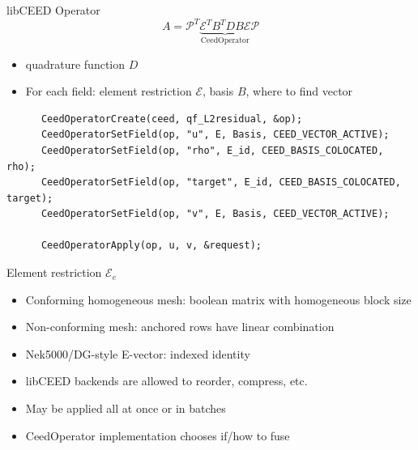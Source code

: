 \documentclass[aspectratio=1610]{beamer}
\begin{document}
\begin{frame}[fragile]{libCEED Operator}
  \begin{equation*}
    A = \mathcal P^T \underbrace{\mathcal E^T B^T D B \mathcal E}_{\text{CeedOperator}} \mathcal P
  \end{equation*}
  \begin{itemize}
  \item quadrature function $D$
  \item For each field: element restriction $\mathcal E$, basis $B$, where to find vector
  \end{itemize}
  \begin{minipage}{\textwidth}
    \begin{verbatim}
      CeedOperatorCreate(ceed, qf_L2residual, &op);
      CeedOperatorSetField(op, "u", E, Basis, CEED_VECTOR_ACTIVE);
      CeedOperatorSetField(op, "rho", E_id, CEED_BASIS_COLOCATED, rho);
      CeedOperatorSetField(op, "target", E_id, CEED_BASIS_COLOCATED, target);
      CeedOperatorSetField(op, "v", E, Basis, CEED_VECTOR_ACTIVE);

      CeedOperatorApply(op, u, v, &request);
    \end{verbatim}
  \end{minipage}
\end{frame}

\begin{frame}{Element restriction $\mathcal E_e$}
  \begin{itemize}
  \item Conforming homogeneous mesh: boolean matrix with homogeneous block size
  \item Non-conforming mesh: anchored rows have linear combination
  \item Nek5000/DG-style E-vector: indexed identity
  \item libCEED backends are allowed to reorder, compress, etc.
  \item May be applied all at once or in batches
  \item CeedOperator implementation chooses if/how to fuse
  \end{itemize}
\end{frame}
\end{document}
